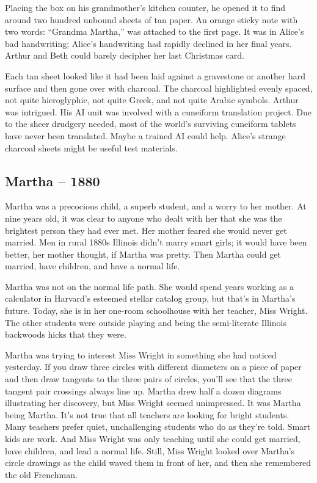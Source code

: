 Placing the box on his grandmother's kitchen counter, he opened it to
find around two hundred unbound sheets of tan paper. An orange sticky
note with two words: ``Grandma Martha,'' was attached to the first page.
It was in Alice's bad handwriting; Alice's handwriting had rapidly
declined in her final years. Arthur and Beth could barely decipher her
last Christmas card.

Each tan sheet looked like it had been laid against a gravestone or
another hard surface and then gone over with charcoal. The charcoal
highlighted evenly spaced, not quite hieroglyphic, not quite Greek, and
not quite Arabic symbols. Arthur was intrigued. His AI unit was involved
with a cuneiform translation project. Due to the sheer drudgery needed,
most of the world's surviving cuneiform tablets have never been
translated. Maybe a trained AI could help. Alice's strange charcoal
sheets might be useful test materials.

\hypertarget{martha-1880}{%
\subsection*{Martha -- 1880}\label{martha-1880}}

Martha was a precocious child, a superb student, and a worry to her
mother. At nine years old, it was clear to anyone who dealt with her
that she was the brightest person they had ever met. Her mother feared
she would never get married. Men in rural 1880s Illinois didn't marry
smart girls; it would have been better, her mother thought, if Martha
was pretty. Then Martha could get married, have children, and have a
normal life.

Martha was not on the normal life path. She would spend years working as
a calculator in Harvard's esteemed stellar catalog group, but that's in
Martha's future. Today, she is in her one-room schoolhouse with her
teacher, Miss Wright. The other students were outside playing and being
the semi-literate Illinois backwoods hicks that they were.

Martha was trying to interest Miss Wright in something she had noticed
yesterday. If you draw three circles with different diameters on a piece
of paper and then draw tangents to the three pairs of circles, you'll
see that the three tangent pair crossings always line up. Martha drew
half a dozen diagrams illustrating her discovery, but Miss Wright seemed
unimpressed. It was Martha being Martha. It's not true that all teachers
are looking for bright students. Many teachers prefer quiet,
unchallenging students who do as they're told. Smart kids are work. And
Miss Wright was only teaching until she could get married, have
children, and lead a normal life. Still, Miss Wright looked over
Martha's circle drawings as the child waved them in front of her, and
then she remembered the old Frenchman.

